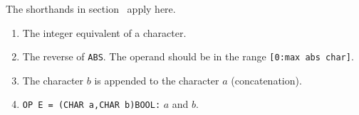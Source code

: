 The shorthands in section~ apply here.
\begin{enumerate}
\item {} \newline
The integer equivalent of a character.
\item {} \newline
The reverse of \verb|ABS|. The operand should be in the range
\verb|[0:max abs char]|.
\item {}\newline
The character $b$ is appended to the character $a$ (concatenation).
\item \verb|OP E = (CHAR a,CHAR b)BOOL:| \newline
{} 
 
 
$a$ and $b$.
\end{enumerate}

